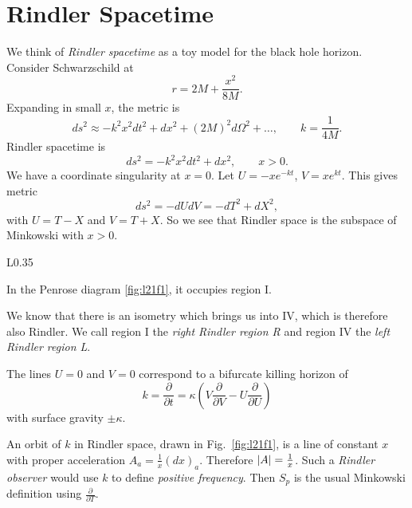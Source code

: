 
\section{Rindler Spacetime}%
\label{sec:rindler_spacetime}

We think of \emph{Rindler spacetime} as a toy model for the black hole horizon.
Consider Schwarzschild at
\begin{equation}
  r = 2 M + \frac{x^2}{8 M}.
\end{equation}
Expanding in small $x$, the metric is
\begin{equation}
  ds^2 \approx -k^2 x^2 dt^2 + dx^2 + (2M)^2 d\Omega^2 + \dots, \qquad k = \frac{1}{4 M}.
\end{equation}
Rindler spacetime is
\begin{equation}
  ds^2 = -k^2 x^2 dt^2 + dx^2, \qquad x > 0.
\end{equation}
We have a coordinate singularity at $x = 0$.
Let $U = -x e^{-kt}$, $V = xe^{kt}$. This gives metric
\begin{equation}
  ds^2 = - dU dV = - dT^2 + dX^2,
\end{equation}
with $U = T - X$ and $V = T + X$.
So we see that Rindler space is the subspace of Minkowski with $x > 0$.
\begin{wrapfigure}{L}{0.35\textwidth}
  \centering
  \caption{Rindler spacetime is the shaded subset of Minkowski spacetime.}
  \label{fig:l21f1}
\end{wrapfigure}
In the Penrose diagram \ref{fig:l21f1}, it occupies region I.

We know that there is an isometry which brings us into IV, which is therefore also Rindler.
We call region I the \emph{right Rindler region R} and region IV the \emph{left Rindler region L}.

The lines $U = 0$ and $V = 0$ correspond to a bifurcate killing horizon of 
\begin{equation}
  k = \frac{\partial }{\partial t} = \kappa (V \frac{\partial }{\partial V} - U \frac{\partial }{\partial U})
\end{equation}
with surface gravity $\pm \kappa$.

An orbit of $k$ in Rindler space, drawn in Fig.~\ref{fig:l21f1},  is a line of constant $x$ with proper acceleration $A_{a} = \frac{1}{x} (dx)_a$. Therefore $\abs{A} = \frac{1}{x}$.
Such a \emph{Rindler observer} would use $k$ to define \emph{positive frequency}.
Then $S_p$ is the usual Minkowski definition using $\frac{\partial }{\partial T}$.

